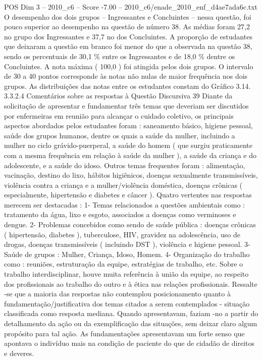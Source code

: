 \begin{textsample}{POS Dim 3 – 2010\_c6 – Score -7.00 – 2010\_c6/enade\_2010\_enf\_d4ae7ada6c.txt}
O desempenho dos dois grupos – Ingressantes e Concluintes – nessa questão, foi pouco superior ao desempenho na questão de número 38.
As médias foram 27,2 no grupo dos Ingressantes e 37,7 no dos Concluintes.
A proporção de estudantes que deixaram a questão em branco foi menor do que a observada na questão 38, sendo os percentuais de 30,1 \% entre os Ingressantes e de 18,0 \% dentre os Concluintes.
A nota máxima ( 100,0 ) foi atingida pelos dois grupos.
O intervalo de 30 a 40 pontos corresponde às notas não nulas de maior frequência nos dois grupos.
As distribuições das notas entre os estudantes constam do Gráfico 3.14. 3.3.2.4 Comentários sobre as respostas à Questão Discursiva 39 Diante da solicitação de apresentar e fundamentar três temas que deveriam ser discutidos por enfermeiras em reunião para alcançar o cuidado coletivo, os principais aspectos abordados pelos estudantes foram : saneamento básico, higiene pessoal, saúde dos grupos humanos, dentre os quais a saúde da mulher, incluindo a mulher no ciclo grávido-puerperal, a saúde do homem ( que surgiu praticamente com a mesma frequência em relação à saúde da mulher ), a saúde da criança e do adolescente, e a saúde do idoso.
Outros temas frequentes foram : alimentação, vacinação, destino do lixo, hábitos higiênicos, doenças sexualmente transmissíveis, violência contra a criança e a mulher/violência doméstica, doenças crônicas ( especialmente, hipertensão e diabetes e câncer ).
Quatro vertentes nas respostas merecem ser destacadas : 1- Temas relacionados a questões ambientais como : tratamento da água, lixo e esgoto, associados a doenças como verminoses e dengue. 2- Problemas concebidos como sendo de saúde pública : doenças crônicas ( hipertensão, diabetes ), tuberculose, HIV, gravidez na adolescência, uso de drogas, doenças transmissíveis ( incluindo DST ), violência e higiene pessoal. 3- Saúde de grupos : Mulher, Criança, Idoso, Homem. 4- Organização do trabalho como : reuniões, estruturação da equipe, estratégias de trabalho, etc.
Sobre o trabalho interdisciplinar, houve muita referência à união da equipe, ao respeito dos profissionais ao trabalho do outro e à ética nas relações profissionais.
Ressalte -se que a maioria das respostas não contemplou posicionamento quanto à fundamentação/justificativa dos temas citados a serem contemplados - situação classificada como resposta mediana.
Quando apresentavam, faziam -no a partir do detalhamento da ação ou da exemplificação das situações, sem deixar claro algum propósito para tal ação.
As fundamentações apresentavam um forte senso que apontava o indivíduo mais na condição de paciente do que de cidadão de direitos e deveres.

\end{textsample}
